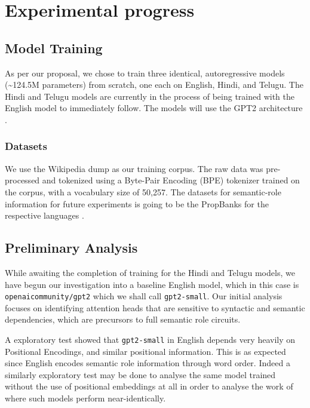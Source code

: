\documentclass[11pt]{article}
\begin{document}
\section*{Experimental progress}
\label{sec:orga00d5a0}

\subsection*{Model Training}
\label{sec:org80f2375}

As per our proposal, we chose to train three identical, autoregressive models (\textasciitilde{}124.5M parameters) from scratch, one each on English, Hindi, and Telugu. The Hindi and Telugu models are currently in the process of being trained with the English model to immediately follow. The models will use the GPT2 architecture \citep{Radford2019LanguageMA}.
\subsubsection*{Datasets}
\label{sec:org18f3369}

We use the Wikipedia dump \citep{wikidump} as our training corpus. The raw data was pre-processed and tokenized using a Byte-Pair Encoding (BPE) tokenizer trained on the corpus, with a vocabulary size of 50,257.
The datasets for semantic-role information for future experiments is going to be the PropBanks for the respective languages \citep{10.1162/0891201053630264,Bhat2017,jindal-EtAl:2022:LREC,akbik-etal-2015-generating}.
\subsection*{Preliminary Analysis}
\label{sec:org05699af}

While awaiting the completion of training for the Hindi and Telugu models, we have begun our investigation into a baseline English model, which in this case is \texttt{openaicommunity/gpt2} which we shall call \texttt{gpt2-small}. Our initial analysis focuses on identifying attention heads that are sensitive to syntactic and semantic dependencies, which are precursors to full semantic role circuits.

A exploratory test showed that \texttt{gpt2-small} in English depends very heavily on Positional Encodings, and similar positional information. This is as expected since English encodes semantic role information through word order. Indeed a similarly exploratory test may be done to analyse the same model trained without the use of positional embeddings at all in order to analyse the work of \citet{haviv.etal2022} where such models perform near-identically.
\end{document}
